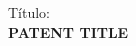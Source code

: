 
\newcommand{\patente}[2]{
\cleardoublepage
\vspace*{10cm}
Título: 
\\[5pt]
\uppercase{\textbf{#1}}\\
\bigskip

\cleardoublepage
 

}

\patente{Patent Title}{patent}

